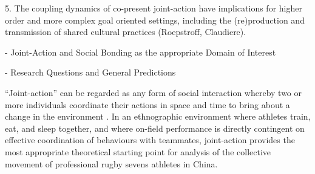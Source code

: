 \documentclass[12pt]{report}
\begin{document}
5. The coupling dynamics of co-present joint-action have implications for higher order and more complex goal oriented settings, including the (re)production and transmission of shared cultural practices (Roepstroff, Claudiere).



-  Joint-Action and Social Bonding as the appropriate Domain of Interest

- Research Questions and General Predictions









 ``Joint-action'' can be regarded as any form of social interaction whereby two or more individuals coordinate their actions in space and time to bring about a change in the environment \citep{Sebanz2006a}.  In an ethnographic environment where athletes train, eat, and sleep together, and where on-field performance is directly contingent on effective coordination of behaviours with teammates, joint-action provides the most appropriate theoretical starting point for analysis of the collective movement of professional rugby sevens athletes in China.













\printbibliography
\end{document}
